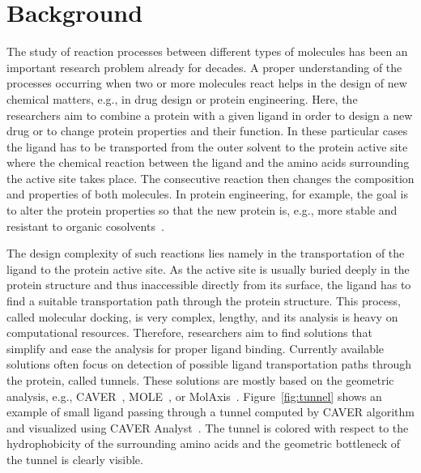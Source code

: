 \documentclass[twocolumn]{bmcart}%
\begin{document}

\section*{Background}
The study of reaction processes between different types of molecules has been an important research problem already for decades.
A proper understanding of the processes occurring when two or more molecules react helps in the design of new chemical matters, e.g., in drug design or protein engineering.
Here, the researchers aim to combine a protein with a given ligand in order to design a new drug or to change protein properties and their function.
In these particular cases the ligand has to be transported from the outer solvent to the protein active site where the chemical reaction between the ligand and the amino acids surrounding the active site takes place.
The consecutive reaction then changes the composition and properties of both molecules. 
In protein engineering, for example, the goal is to alter the protein properties so that the new protein is, e.g., more stable and resistant to organic cosolvents~\cite{Koudelakova2013}.

The design complexity of such reactions lies namely in the transportation of the ligand to the protein active site.
As the active site is usually buried deeply in the protein structure and thus inaccessible directly from its surface, the ligand has to find a suitable transportation path through the protein structure.
This process, called molecular docking, is very complex, lengthy, and its analysis is heavy on computational resources. 
Therefore, researchers aim to find solutions that simplify and ease the analysis for proper ligand binding.
Currently available solutions often focus on detection of possible ligand transportation paths through the protein, called tunnels.
These solutions are mostly based on the geometric analysis, e.g., CAVER~\cite{Chovancova2012}, MOLE~\cite{Sehnal2013}, or MolAxis~\cite{Yaffe2008}.
Figure~\ref{fig:tunnel} shows an example of small ligand passing through a tunnel computed by CAVER algorithm and visualized using CAVER Analyst~\cite{Kozlikova2014}. 
The tunnel is colored with respect to the hydrophobicity of the surrounding amino acids and the geometric bottleneck of the tunnel is clearly visible.
\end{document}
